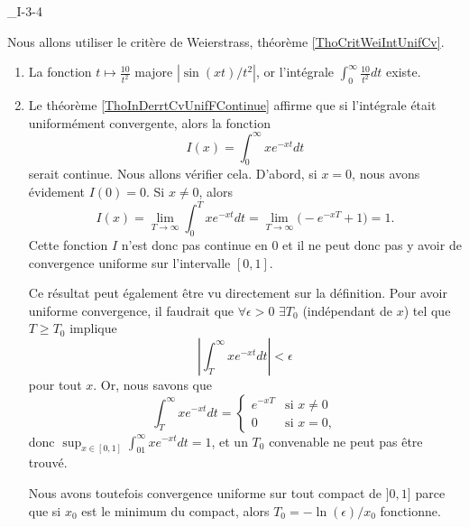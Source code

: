 

\begin{corrige}{_I-3-4}

Nous allons utiliser le critère de Weierstrass, théorème \ref{ThoCritWeiIntUnifCv}.

\begin{enumerate}
\item
	 La fonction $t\mapsto\frac{ 10 }{ t^2 }$ majore $| \sin(xt)/t^2 |$, or l'intégrale $\int_0^{\infty}\frac{ 10 }{ t^2 } dt$ existe.
\item 

	Le théorème \ref{ThoInDerrtCvUnifFContinue} affirme que si l'intégrale était uniformément convergente, alors la fonction
	\begin{equation}
		I(x)=\int_0^{\infty}x e^{-xt}dt
	\end{equation}
	serait continue. Nous allons vérifier cela. D'abord, si $x=0$, nous avons évidement $I(0)=0$. Si $x\neq 0$, alors
	\begin{equation}
		I(x)=\lim_{T\to\infty}\int_0^{T}x e^{-xt}dt=\lim_{T\to\infty}\big( - e^{-xT}+1 \big)=1.
	\end{equation}
	Cette fonction $I$ n'est donc pas continue en $0$ et il ne peut donc pas y avoir de convergence uniforme sur l'intervalle $[0,1]$.

	Ce résultat peut également être vu directement sur la définition. Pour avoir uniforme convergence, il faudrait que $\forall\epsilon>0$ $\exists T_0$ (indépendant de $x$) tel que $T\geq T_0$ implique
	\begin{equation}
		\left| \int_T^{\infty} x e^{-xt}dt\right|<\epsilon
	\end{equation}
pour tout $x$. Or, nous savons que
\begin{equation}
	 \int_T^{\infty} x e^{-xt}dt=
		\begin{cases}
	 e^{-xT}	&	\text{si $x\neq 0$}\\
	0	&	 \text{si $x=0$},
\end{cases}
\end{equation}
donc $\sup_{x\in[0,1]}\int_01^{\infty}x e^{-xt}dt=1$, et un $T_0$ convenable ne peut pas être trouvé.

	Nous avons toutefois convergence uniforme sur tout compact de $]0,1]$ parce que si $x_0$ est le minimum du compact, alors $T_0=-\ln(\epsilon)/x_{0}$ fonctionne.


\end{enumerate}
\end{corrige}
